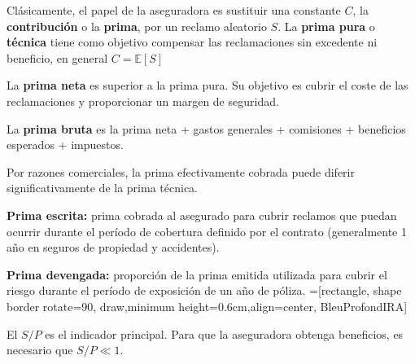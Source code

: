 \begin{f}
Clásicamente, el papel de la aseguradora es sustituir una constante \(C\), la \textbf{contribución} o la \textbf{prima}, por un reclamo aleatorio \(S\).
La \textbf{prima pura} o \textbf{técnica} tiene como objetivo 
compensar las reclamaciones sin excedente ni beneficio, en general \(C = \mathbb{E}[S]\)
	
	La \textbf{prima neta} es superior a la prima pura. Su objetivo es cubrir el coste de las reclamaciones y proporcionar un margen de seguridad.
	
	La \textbf{prima bruta} es la prima neta + gastos generales + comisiones + beneficios esperados + impuestos.
	
	Por razones comerciales, la prima efectivamente cobrada puede diferir significativamente de la prima técnica.

	\textbf{Prima escrita:} prima cobrada al asegurado para cubrir reclamos que puedan ocurrir durante el período de 
cobertura definido por el contrato (generalmente 1 año en seguros de propiedad y accidentes).

\textbf{Prima devengada:} proporción de la prima emitida utilizada para cubrir el riesgo durante el período de exposición de un 
año de póliza.
=[rectangle, shape border rotate=90, draw,minimum height=0.6cm,align=center, BleuProfondIRA]

\resizebox{\linewidth}{!}
{
}
El \(S/P\) es el indicador principal. Para que la aseguradora obtenga beneficios, es necesario que \(S/P\ll 1\). 
\end{f}

